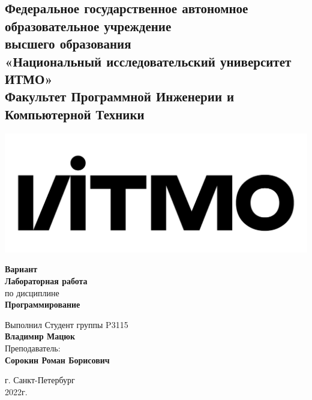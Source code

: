 \documentclass{article}
\begin{document}
\begin{center}
  \section*{
    Федеральное государственное автономное образовательное учреждение\\ высшего образования\\
    «Национальный исследовательский университет ИТМО»\\
    Факультет Программной Инженерии и Компьютерной Техники \\
   }
  \includegraphics[scale=0.2]{../../lib/img/itmo.png}
\end{center}
\vspace{4cm}


\begin{center}
  \large \textbf{Вариант }\\
  \textbf{Лабораторная работа }\\
  по дисциплине\\
  \textbf{Программирование}
\end{center}

\vspace*{\fill}

\begin{flushright}
  Выполнил Студент группы P3115\\
  \textbf{Владимир Мацюк}\\
  Преподаватель: \\
  \textbf{Сорокин Роман Борисович}\\
\end{flushright}

\vspace{1cm}

\begin{center}
  г. Санкт-Петербург\\
  2022г.
\end{center}

\newpage
\end{document}
